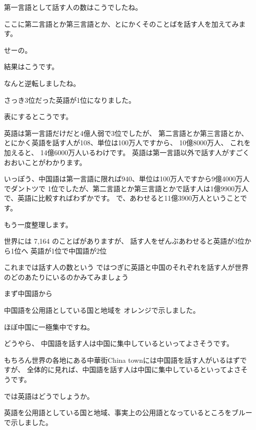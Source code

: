 \documentclass[12pt]{jlreq}
\begin{document}
\hrulefill

第一言語として話す人の数はこうでしたね。

ここに第二言語とか第三言語とか、とにかくそのことばを話す人を加えてみます。

せーの。


\hrulefill

結果はこうです。

なんと逆転しましたね。

さっき3位だった英語が1位になりました。

\hrulefill

表にするとこうです。

英語は第一言語だけだと4億人弱で3位でしたが、
第二言語とか第三言語とか、とにかく英語を話す人が108、単位は100万人ですから、
10億8000万人、
これを加えると、
14億6000万人いるわけです。
英語は第一言語以外で話す人がすごくおおいことがわかります。

いっぽう、中国語は第一言語に限れば940、単位は100万人ですから9億4000万人でダントツで
1位でしたが、第二言語とか第三言語とかで話す人は1億9900万人で、英語に比較すればわずかです。
で、あわせると11億3900万人ということです。

\hrulefill

もう一度整理します。

世界には 7,164 のことばがありますが、
話す人をぜんぶあわせると英語が3位から1位へ
英語が1位で中国語が2位

\hrulefill

これまでは話す人の数という
ではつぎに英語と中国のそれぞれを話す人が世界のどのあたりにいるのかみてみましょう



まず中国語から

\hrulefill

中国語を公用語としている国と地域を
オレンジで示しました。

ほぼ中国に一極集中ですね。

\hrulefill

どうやら、
中国語を話す人は中国に集中しているといってよさそうです。

もちろん世界の各地にある中華街China townには中国語を話す人がいるはずですが、
全体的に見れば、中国語を話す人は中国に集中しているといってよさそうです。

では英語はどうでしょうか。

\hrulefill

英語を公用語としている国と地域、事実上の公用語となっているところをブルーで示しました。

\hrulefill
\end{document}
